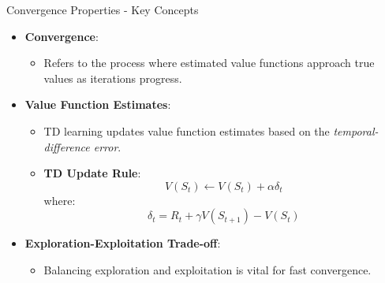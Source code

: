 \documentclass[aspectratio=169]{beamer}
\begin{document}
\begin{frame}[fragile]{Convergence Properties - Key Concepts}
    \begin{itemize}
        \item \textbf{Convergence}:
            \begin{itemize}
                \item Refers to the process where estimated value functions approach true values as iterations progress.
            \end{itemize}
        \item \textbf{Value Function Estimates}:
            \begin{itemize}
                \item TD learning updates value function estimates based on the \textit{temporal-difference error}.
                \item \textbf{TD Update Rule}:
                \begin{equation} 
                V(S_t) \leftarrow V(S_t) + \alpha \delta_t 
                \end{equation}
                where:
                \[
                \delta_t = R_t + \gamma V(S_{t+1}) - V(S_t)
                \]
            \end{itemize}
        \item \textbf{Exploration-Exploitation Trade-off}:
            \begin{itemize}
                \item Balancing exploration and exploitation is vital for fast convergence.
            \end{itemize}
    \end{itemize}
\end{frame}
\end{document}
